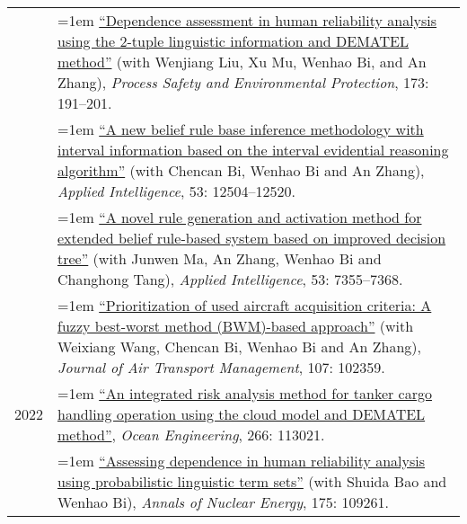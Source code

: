 \documentclass[11pt,english]{article}
\begin{document}
\begin{tabular}{p{.85in}>{\hangindent=1em}p{5.65in}<{\raggedright}}
 &  \href{https://doi.org/10.1016/j.psep.2023.03.026}{``Dependence assessment in human reliability analysis using the 2-tuple linguistic information and DEMATEL method''} (with Wenjiang Liu, Xu Mu, Wenhao Bi, and An Zhang), \textit{Process Safety and Environmental Protection}, 173: 191--201. \\

 &  \href{https://doi.org/10.1007/s10489-022-04182-z}{``A new belief rule base inference methodology with interval information based on the interval evidential reasoning algorithm''} (with Chencan Bi, Wenhao Bi and An Zhang), \textit{Applied Intelligence}, 53: 12504--12520. \\

 &  \href{https://doi.org/10.1007/s10489-022-03803-x}{``A novel rule generation and activation method for extended belief rule-based system based on improved decision tree''} (with Junwen Ma, An Zhang, Wenhao Bi and Changhong Tang), \textit{Applied Intelligence}, 53: 7355--7368. \\

 &  \href{https://doi.org/10.1016/j.jairtraman.2023.102359}{``Prioritization of used aircraft acquisition criteria: A fuzzy best-worst method (BWM)-based approach''} (with Weixiang Wang, Chencan Bi, Wenhao Bi and An Zhang), \textit{Journal of Air Transport Management}, 107: 102359. \\
 
2022 &  \href{https://doi.org/10.1016/j.oceaneng.2022.113021}{``An integrated risk analysis method for tanker cargo handling operation using the cloud model and DEMATEL method''}, \textit{Ocean Engineering}, 266: 113021. \\

 &  \href{https://doi.org/10.1016/j.anucene.2022.109261}{``Assessing dependence in human reliability analysis using probabilistic linguistic term sets''} (with Shuida Bao and Wenhao Bi), \textit{Annals of Nuclear Energy}, 175: 109261. \\
 

\end{tabular}
\end{document}
